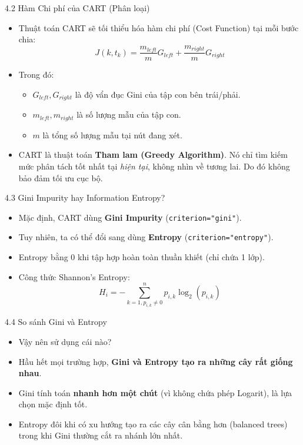 \documentclass[aspectratio=169, 12pt]{beamer}
\begin{document}
\begin{frame}{4.2 Hàm Chi phí của CART (Phân loại)}
    \begin{itemize}
        \item Thuật toán CART sẽ tối thiểu hóa hàm chi phí (Cost Function) tại mỗi bước chia:
        $$ J(k, t_k) = \frac{m_{left}}{m} G_{left} + \frac{m_{right}}{m} G_{right} $$
        \item Trong đó:
        \begin{itemize}
            \item $G_{left}, G_{right}$ là độ vẩn đục Gini của tập con bên trái/phải.
            \item $m_{left}, m_{right}$ là số lượng mẫu của tập con.
            \item $m$ là tổng số lượng mẫu tại nút đang xét.
        \end{itemize}
        \item CART là thuật toán \textbf{Tham lam (Greedy Algorithm)}. Nó chỉ tìm kiếm mức phân tách tốt nhất tại \textit{hiện tại}, không nhìn về tương lai. Do đó không bảo đảm tối ưu cục bộ.
    \end{itemize}
\end{frame}

\begin{frame}{4.3 Gini Impurity hay Information Entropy?}
    \begin{itemize}
        \item Mặc định, CART dùng \textbf{Gini Impurity} (\texttt{criterion="gini"}).
        \item Tuy nhiên, ta có thể đổi sang dùng \textbf{Entropy} (\texttt{criterion="entropy"}).
        \item Entropy bằng $0$ khi tập hợp hoàn toàn thuần khiết (chỉ chứa 1 lớp).
        \item Công thức Shannon's Entropy:
        $$ H_i = -\sum_{k=1, p_{i,k} \neq 0}^{n} p_{i,k} \log_2(p_{i,k}) $$
    \end{itemize}
\end{frame}

\begin{frame}{4.4 So sánh Gini và Entropy}
    \begin{itemize}
        \item Vậy nên sử dụng cái nào?
        \item Hầu hết mọi trường hợp, \textbf{Gini và Entropy tạo ra những cây rất giống nhau}.
        \item Gini tính toán \textbf{nhanh hơn một chút} (vì không chứa phép Logarit), là lựa chọn mặc định tốt.
        \item Entropy đôi khi có xu hướng tạo ra các cây cân bằng hơn (balanced trees) trong khi Gini thường cắt ra nhánh lớn nhất.
    \end{itemize}
\end{frame}
\end{document}
